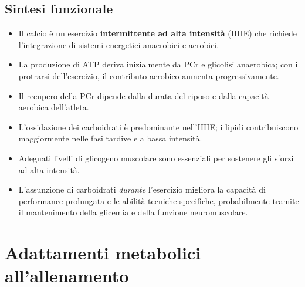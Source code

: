\documentclass[12pt,a4paper]{report}
\begin{document}
\section{Sintesi funzionale}
\begin{itemize}
\item Il calcio è un esercizio \textbf{intermittente ad alta intensità} (HIIE) che richiede l'integrazione di sistemi energetici anaerobici e aerobici.
\item La produzione di ATP deriva inizialmente da PCr e glicolisi anaerobica; con il protrarsi dell'esercizio, il contributo aerobico aumenta progressivamente.
\item Il recupero della PCr dipende dalla durata del riposo e dalla capacità aerobica dell'atleta.
\item L'ossidazione dei carboidrati è predominante nell'HIIE; i lipidi contribuiscono maggiormente nelle fasi tardive e a bassa intensità.
\item Adeguati livelli di glicogeno muscolare sono essenziali per sostenere gli sforzi ad alta intensità.
\item L'assunzione di carboidrati \textit{durante} l'esercizio migliora la capacità di performance prolungata e le abilità tecniche specifiche, probabilmente tramite il mantenimento della glicemia e della funzione neuromuscolare.
\end{itemize}


\chapter{Adattamenti metabolici all'allenamento}
\end{document}
